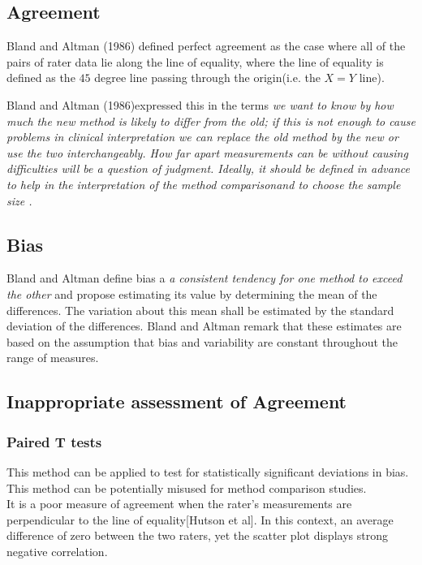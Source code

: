 \documentclass[12pt, a4paper]{report}
\theoremstyle{plain}
\theoremstyle{definition}
\theoremstyle{remark}
\begin{document}
	\subsection{Agreement} Bland and Altman (1986) defined perfect
	agreement as the case where all of the pairs of rater data lie
	along the line of equality, where the line of equality is defined
	as the $45$ degree line passing through the origin(i.e. the $X=Y$
	line).
	
	Bland and Altman (1986)expressed this in the terms \emph{we want
		to know by how much the new method is likely to differ from the
		old; if this is not enough to cause problems in clinical
		interpretation we can replace the old method by the new or use the
		two interchangeably. How far apart measurements can be without
		causing difficulties will be a question of judgment. Ideally, it
		should be defined in advance to help in the interpretation of the
		method comparisonand to choose the sample size .}
	\subsection{Bias}
	Bland and Altman define bias a \emph{a consistent tendency for one
		method to exceed the other} and propose estimating its value
	by determining the mean of the differences. The variation about
	this mean shall be estimated by the  standard deviation of the
	differences. Bland and Altman remark that these estimates are based on the
	assumption that bias and variability are constant throughout the
	range of measures.
	\subsection{Inappropriate assessment of Agreement}
	\subsubsection{Paired T tests} This method can be applied to test for
	statistically significant deviations in bias. This method can be
	potentially misused for method comparison studies.
	\\It is a poor measure of agreement when the rater's measurements
	are perpendicular to the line of equality[Hutson et al]. In this
	context, an average difference of zero between the two raters, yet
	the scatter plot displays strong negative correlation.
\end{document}
